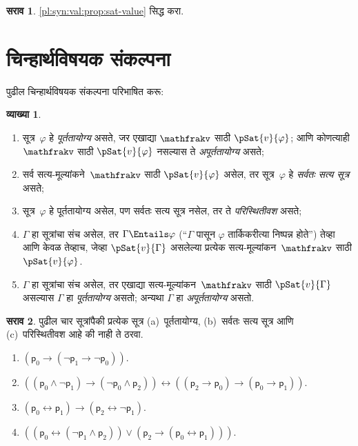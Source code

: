 \documentclass[11pt,a4paper,openany]{book}
\theoremstyle{definition}
\newtheorem{defn}{व्याख्या}[section]
\newtheorem{prob}{सराव}[chapter]
\newcommand{\lif}{\mathbin{\to}}
\newcommand{\liff}{\mathbin{\leftrightarrow}}
\newcommand{\applytofirst}[2]{{\expandafter#1#2}}
\newcommand{\Obj}[1]{\mathsf{#1}}
\newcommand{\pAssign}[1]{\applytofirst{\mathfrak}{#1}}
\begin{document}
\begin{prob}
  \ref{pl:syn:val:prop:sat-value} सिद्ध करा.
\end{prob}









\section{चिन्हार्थविषयक संकल्पना}\label{pl:syn:sem:sec}

पुढील चिन्हार्थविषयक संकल्पना परिभाषित करू:

\begin{defn}
\begin{enumerate}
\item सूत्र~$\varphi$ हे \emph{पूर्ततायोग्य} असते, जर एखाद्या
  $\pAssign{v}$ साठी $\pSat{v}{\varphi}$; आणि कोणत्याही $\pAssign{v}$ साठी
  $\pSat{v}{\varphi}$ नसल्यास ते \emph{अपूर्ततायोग्य} असते;
\item सर्व सत्य-मूल्यांकने~$\pAssign{v}$ साठी $\pSat{v}{\varphi}$ असेल, तर
  सूत्र~$\varphi$ हे \emph{सर्वतः सत्य सूत्र} असते;
\item सूत्र~$\varphi$ हे पूर्ततायोग्य असेल, पण सर्वतः सत्य सूत्र नसेल,
  तर ते \emph{परिस्थितीवश} असते;
\item $\Gamma$ हा सूत्रांचा संच असेल, तर $\Gamma \Entails \varphi$
  (``$\Gamma$ पासून $\varphi$ तार्किकरीत्या निष्पन्न होते'') तेव्हा आणि केवळ
  तेव्हाच, जेव्हा $\pSat{v}{\Gamma}$ असलेल्या प्रत्येक
  सत्य-मूल्यांकन~$\pAssign{v}$ साठी $\pSat{v}{\varphi}$.
\item $\Gamma$ हा सूत्रांचा संच असेल, तर एखाद्या
  सत्य-मूल्यांकन~$\pAssign{v}$ साठी $\pSat{v}{\Gamma}$ असल्यास $\Gamma$
  हा \emph{पूर्ततायोग्य} असतो; अन्यथा $\Gamma$ हा
  \emph{अपूर्ततायोग्य} असतो.
\end{enumerate}
\end{defn}

\begin{prob}
 पुढील चार सूत्रांपैकी प्रत्येक सूत्र (a)~पूर्ततायोग्य,
 (b)~सर्वतः सत्य सूत्र आणि (c)~परिस्थितीवश आहे की नाही ते ठरवा.
\begin{enumerate}
  \item \( ( \Obj p_0 \lif ( \lnot \Obj p_1 \lif \lnot \Obj p_0 ) ) \).
  \item \( ( ( \Obj p_0 \land \lnot \Obj p_1 ) \lif ( \lnot \Obj p_0 \land \Obj p_2 )) \liff ( ( \Obj p_2 \lif \Obj p_0 ) \lif ( \Obj p_0 \lif \Obj p_1 )) \).
  \item \( ( \Obj p_0 \liff \Obj p_1 ) \lif ( \Obj p_2 \liff \lnot \Obj p_1 ) \).
  \item \( (( \Obj p_0 \liff ( \lnot \Obj p_1 \land \Obj p_2 )) \lor ( \Obj p_2 \lif ( \Obj p_0 \liff \Obj p_1 ))) \).
\end{enumerate}
\end{prob}
\end{document}
